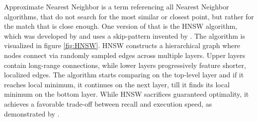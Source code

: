 Approximate Nearest Neighbor is a term referencing all Nearest Neighbor algorithms, that do not search for the most similar or closest point, but rather for the match that is close enough. One version of that is the HNSW algorithm, which was developed by \citet{Malkov.2014} and uses a skip-pattern invented by \citet{Pugh.1990}. The algorithm is visualized in figure \ref{fig:HNSW}. HNSW constructs a hierarchical graph where nodes connect via randomly sampled edges across multiple layers. Upper layers contain long-range connections, while lower layers progressively feature shorter, localized edges. The algorithm starts comparing on the top-level layer and if it reaches local minimum, it continues on the next layer, till it finds its local minimum on the bottom layer. While HNSW sacrifices guaranteed optimality, it achieves a favorable trade-off between recall and execution speed, as demonstrated by \citet{ErikBernhardsson.22.01.2025}.

